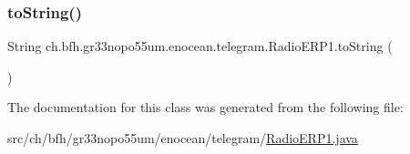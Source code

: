 \hypertarget{classch_1_1bfh_1_1gr33nopo55um_1_1enocean_1_1telegram_1_1_radio_e_r_p1_ab94adfea73a72479616a8e862c353c11}{}\label{classch_1_1bfh_1_1gr33nopo55um_1_1enocean_1_1telegram_1_1_radio_e_r_p1_ab94adfea73a72479616a8e862c353c11} 
\subsubsection{\texorpdfstring{to\+String()}{toString()}}
{\footnotesize\ttfamily String ch.\+bfh.\+gr33nopo55um.\+enocean.\+telegram.\+Radio\+E\+R\+P1.\+to\+String (\begin{DoxyParamCaption}{ }\end{DoxyParamCaption})}



The documentation for this class was generated from the following file\+:\begin{DoxyCompactItemize}
\item 
src/ch/bfh/gr33nopo55um/enocean/telegram/\hyperlink{_radio_e_r_p1_8java}{Radio\+E\+R\+P1.\+java}\end{DoxyCompactItemize}
